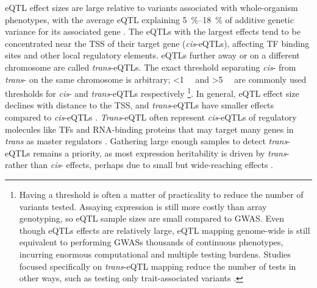 \begin{outline}
\gls{eQTL} effect sizes are large relative to variants associated with whole-organism phenotypes,
with the average \gls{eQTL} explaining \SIrange{5}{18}{\percent} of additive genetic variance for its associated gene \autocite{gaffney2013GlobalPropertiesFunctional}.
The \glspl{eQTL} with the largest effects tend to be concentrated near the \gls{TSS} of their target gene (\textit{cis}-\glspl{eQTL}), affecting \gls{TF} binding sites and other local regulatory elements.
\glspl{eQTL} further away or on a different chromosome are called \textit{trans}-\glspl{eQTL}.
The exact threshold separating \textit{cis}- from \textit{trans}- on the same chromosome is arbitrary; \SI{<1}{\mega\bp} and \SI{>5}{\mega\bp} are commonly used thresholds for \textit{cis}- and \textit{trans}-\glspl{eQTL} respectively \autocite{westra2014GenomeFunctionStudying,albert2015RoleRegulatoryVariation,vosa2018UnravelingPolygenicArchitecture}%
\footnote{
    Having a threshold is often a matter of practicality to reduce the number of variants tested.
    Assaying expression is still more costly than array genotyping, so \gls{eQTL} sample sizes are small compared to \gls{GWAS}.
    Even though \glspl{eQTL} effects are relatively large, \gls{eQTL} mapping genome-wide is still equivalent to performing \glspl{GWAS} thousands of continuous phenotypes,
    incurring enormous computational and multiple testing burdens.
    Studies focused specifically on \textit{trans}-\gls{eQTL} mapping reduce the number of tests in other ways, such as testing only trait-associated variants \autocite{vosa2018UnravelingPolygenicArchitecture}.
}.
In general, \gls{eQTL} effect size declines with distance to the \gls{TSS}, and \textit{trans}-\glspl{eQTL} have smaller effects compared to \textit{cis}-\glspl{eQTL} \autocite{vandiedonck2017GeneticAssociationMolecular}.
\textit{Trans}-\gls{eQTL} often represent \textit{cis}-\glspl{eQTL} of regulatory molecules like \glspl{TF} and RNA-binding proteins that may target many genes in \textit{trans} as master regulators \autocite{fairfax2012GeneticsGeneExpression,albert2015RoleRegulatoryVariation}.
Gathering large enough samples to detect \textit{trans}-\glspl{eQTL} remains a priority,
as most expression heritability is driven by \textit{trans}- rather than \textit{cis}- effects,
perhaps due to small but wide-reaching effects \autocite{liu2019TransEffectsGene}.


\end{outline}
